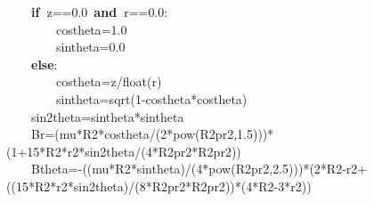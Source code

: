 \documentclass{article}
\newcommand{\hlstd}[1]{\textcolor[rgb]{0,0,0}{#1}}
\newcommand{\hlnum}[1]{\textcolor[rgb]{0.16,0.16,1}{#1}}
\newcommand{\hlsym}[1]{\textcolor[rgb]{0,0,0}{#1}}
\newcommand{\hlkwa}[1]{\textcolor[rgb]{0,0,0}{\bf{#1}}}
\newcommand{\hlkwb}[1]{\textcolor[rgb]{0.51,0,0}{#1}}
\newcommand{\hlkwd}[1]{\textcolor[rgb]{0,0,0.51}{#1}}
\begin{document}
\hlstd{}\hlstd{\ \ \ \ }\hlstd{}\hlkwa{if\ }\hlstd{z}\hlsym{==}\hlstd{}\hlnum{0.0\ }\hlstd{}\hlkwa{and\ }\hlstd{r}\hlsym{==}\hlstd{}\hlnum{0.0}\hlstd{}\hlsym{:}\hspace*{\fill}\\
\hlstd{}\hlstd{\ \ \ \ \ \ \ \ }\hlstd{costheta}\hlsym{=}\hlstd{}\hlnum{1.0}\hspace*{\fill}\\
\hlstd{}\hlstd{\ \ \ \ \ \ \ \ }\hlstd{sintheta}\hlsym{=}\hlstd{}\hlnum{0.0}\hspace*{\fill}\\
\hlstd{}\hlstd{\ \ \ \ }\hlstd{}\hlkwa{else}\hlstd{}\hlsym{:}\hspace*{\fill}\\
\hlstd{}\hlstd{\ \ \ \ \ \ \ \ }\hlstd{costheta}\hlsym{=}\hlstd{z}\hlsym{/}\hlstd{}\hlkwb{float}\hlstd{}\hlsym{(}\hlstd{r}\hlsym{)}\hspace*{\fill}\\
\hlstd{}\hlstd{\ \ \ \ \ \ \ \ }\hlstd{sintheta}\hlsym{=}\hlstd{}\hlkwd{sqrt}\hlstd{}\hlsym{(}\hlstd{}\hlnum{1}\hlstd{}\hlsym{{-}}\hlstd{costheta}\hlsym{{*}}\hlstd{costheta}\hlsym{)}\hspace*{\fill}\\
\hlstd{}\hlstd{\ \ \ \ }\hlstd{sin2theta}\hlsym{=}\hlstd{sintheta}\hlsym{{*}}\hlstd{sintheta\hspace*{\fill}\\
}\hlstd{\ \ \ \ }\hlstd{Br}\hlsym{=(}\hlstd{mu}\hlsym{{*}}\hlstd{R2}\hlsym{{*}}\hlstd{costheta}\hlsym{/(}\hlstd{}\hlnum{2}\hlstd{}\hlsym{{*}}\hlstd{}\hlkwb{pow}\hlstd{}\hlsym{(}\hlstd{R2pr2}\hlsym{,}\hlstd{}\hlnum{1.5}\hlstd{}\hlsym{))){*}(}\hlstd{}\hlnum{1}\hlstd{}\hlsym{+}\hlstd{}\hlnum{15}\hlstd{}\hlsym{{*}}\hlstd{R2}\hlsym{{*}}\hlstd{r2}\hlsym{{*}}\hlstd{sin2theta}\hlsym{/(}\hlstd{}\hlnum{4}\hlstd{}\hlsym{{*}}\hlstd{R2pr2}\hlsym{{*}}\hlstd{R2pr2}\hlsym{))}\hspace*{\fill}\\
\hlstd{}\hlstd{\ \ \ \ }\hlstd{Btheta}\hlsym{={-}((}\hlstd{mu}\hlsym{{*}}\hlstd{R2}\hlsym{{*}}\hlstd{sintheta}\hlsym{)/(}\hlstd{}\hlnum{4}\hlstd{}\hlsym{{*}}\hlstd{}\hlkwb{pow}\hlstd{}\hlsym{(}\hlstd{R2pr2}\hlsym{,}\hlstd{}\hlnum{2.5}\hlstd{}\hlsym{))){*}(}\hlstd{}\hlnum{2}\hlstd{}\hlsym{{*}}\hlstd{R2}\hlsym{{-}}\hlstd{r2}\hlsym{+((}\hlstd{}\hlnum{15}\hlstd{}\hlsym{{*}}\hlstd{R2}\hlsym{{*}}\hlstd{r2}\hlsym{{*}}\hlstd{sin2theta}\hlsym{)/(}\hlstd{}\hlnum{8}\hlstd{}\hlsym{{*}}\hlstd{R2pr2}\hlsym{{*}}\hlstd{R2pr2}\hlsym{)){*}(}\hlstd{}\hlnum{4}\hlstd{}\hlsym{{*}}\hlstd{R2}\hlsym{{-}}\hlstd{}\hlnum{3}\hlstd{}\hlsym{{*}}\hlstd{r2}\hlsym{))}\hspace*{\fill}\\
\end{document}
